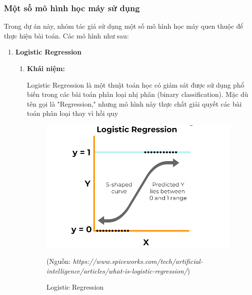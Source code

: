\documentclass[13pt]{article}
\begin{document}
\subsubsection{Một số mô hình học máy sử dụng}
Trong dự án này, nhóm tác giả sử dụng một số mô hình học máy quen thuộc để thực hiện bài toán. Các mô hình như sau:
\begin{enumerate}
    \item \textbf{Logistic Regression}
    \begin{enumerate}
        \item \textbf{Khái niệm: }
        
        Logistic Regression là một thuật toán học có giám sát được sử dụng phổ biến trong các bài toán phân loại nhị phân (binary classification). Mặc dù tên gọi là "Regression," nhưng mô hình này thực chất giải quyết các bài toán phân loại thay vì hồi quy

    \begin{figure}[h!]
        \centering        \includegraphics[width=0.7\linewidth]{image/h9.png}
            \caption{Logistic Regression}
            \label{fig:label1}
            (Nguồn: \textit{https://www.spiceworks.com/tech/artificial-intelligence/articles/what-is-logistic-regression/})
    \end{figure} 


\end{enumerate}
\end{enumerate}
\end{document}

